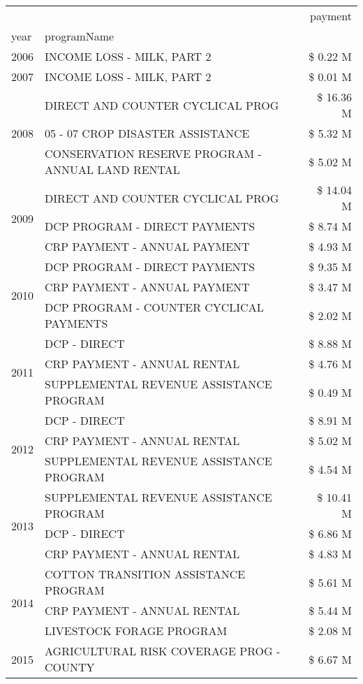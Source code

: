 \begin{tabular}{llr}
\toprule
 &  & payment \\
year & programName &  \\
\midrule
2006 & INCOME LOSS - MILK, PART 2 & \$ 0.22 M \\
\cline{1-3}
2007 & INCOME LOSS - MILK, PART 2 & \$ 0.01 M \\
\cline{1-3}
\multirow[t]{3}{*}{2008} & DIRECT AND COUNTER CYCLICAL PROG & \$ 16.36 M \\
 & 05 - 07 CROP DISASTER ASSISTANCE & \$ 5.32 M \\
 & CONSERVATION RESERVE PROGRAM - ANNUAL LAND RENTAL & \$ 5.02 M \\
\cline{1-3}
\multirow[t]{3}{*}{2009} & DIRECT AND COUNTER CYCLICAL PROG & \$ 14.04 M \\
 & DCP PROGRAM - DIRECT PAYMENTS & \$ 8.74 M \\
 & CRP PAYMENT - ANNUAL PAYMENT & \$ 4.93 M \\
\cline{1-3}
\multirow[t]{3}{*}{2010} & DCP PROGRAM - DIRECT PAYMENTS & \$ 9.35 M \\
 & CRP PAYMENT - ANNUAL PAYMENT & \$ 3.47 M \\
 & DCP PROGRAM - COUNTER CYCLICAL PAYMENTS & \$ 2.02 M \\
\cline{1-3}
\multirow[t]{3}{*}{2011} & DCP - DIRECT & \$ 8.88 M \\
 & CRP PAYMENT - ANNUAL RENTAL & \$ 4.76 M \\
 & SUPPLEMENTAL REVENUE ASSISTANCE PROGRAM & \$ 0.49 M \\
\cline{1-3}
\multirow[t]{3}{*}{2012} & DCP - DIRECT & \$ 8.91 M \\
 & CRP PAYMENT - ANNUAL RENTAL & \$ 5.02 M \\
 & SUPPLEMENTAL REVENUE ASSISTANCE PROGRAM & \$ 4.54 M \\
\cline{1-3}
\multirow[t]{3}{*}{2013} & SUPPLEMENTAL REVENUE ASSISTANCE PROGRAM & \$ 10.41 M \\
 & DCP - DIRECT & \$ 6.86 M \\
 & CRP PAYMENT - ANNUAL RENTAL & \$ 4.83 M \\
\cline{1-3}
\multirow[t]{3}{*}{2014} & COTTON TRANSITION ASSISTANCE PROGRAM & \$ 5.61 M \\
 & CRP PAYMENT - ANNUAL RENTAL & \$ 5.44 M \\
 & LIVESTOCK FORAGE PROGRAM & \$ 2.08 M \\
\cline{1-3}
\multirow[t]{3}{*}{2015} & AGRICULTURAL RISK COVERAGE PROG - COUNTY & \$ 6.67 M \\

\end{tabular}
